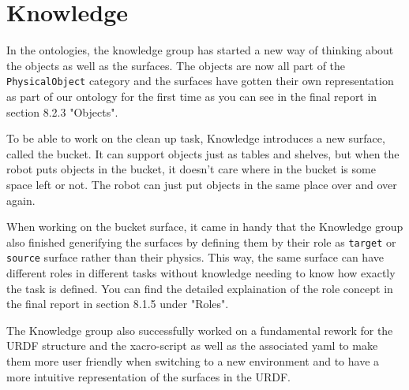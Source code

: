\documentclass[main.tex]{subfiles}
\begin{document}
	
	\chapter{Knowledge}

In the ontologies, the knowledge group has started a new way of thinking about the objects as well as the surfaces. The objects are now all part of the \texttt{PhysicalObject} category and the surfaces have gotten their own representation as part of our ontology for the first time as you can see in the final report in section 8.2.3 "Objects".

To be able to work on the clean up task, Knowledge introduces a new surface, called the bucket. It can support objects just as tables and shelves, but when the robot puts objects in the bucket, it doesn't care where in the bucket is some space left or not. The robot can just put objects in the same place over and over again.

When working on the bucket surface, it came in handy that the Knowledge group also finished generifying the surfaces by defining them by their role as \texttt{target} or \texttt{source} surface rather than their physics. This way, the same surface can have different roles in different tasks without knowledge needing to know how exactly the task is defined. You can find the detailed explaination of the role concept in the final report in section 8.1.5 under "Roles".

The Knowledge group also successfully worked on a fundamental rework for the URDF structure and the xacro-script as well as the associated yaml to make them more user friendly when switching to a new environment and to have a more intuitive representation of the surfaces in the URDF.
	
\end{document}
